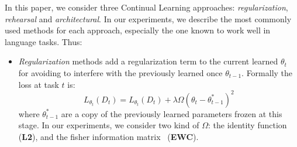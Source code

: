 \documentclass[11pt,a4paper]{article}
\begin{document}
In this paper, we consider three Continual Learning approaches: \textit{regularization},
\textit{rehearsal} and \textit{architectural}. In our experiments, we describe the most commonly used methods for each approach, especially the one known to work well in language tasks. Thus:
\begin{itemize}[noitemsep]
    \item \textit{Regularization} methods add a regularization term to the current learned $\theta_t$ for avoiding to interfere with the previously learned once $\theta_{t-1}$. Formally the loss at task $t$ is:
    \begin{equation}
        L_{\theta_t}(D_t) = L_{\theta_t}(D_t) + \lambda \Omega (\theta_t - \theta^*_{t-1})^2
    \end{equation}
    where $\theta^*_{t-1}$ are a copy of the previously learned parameters frozen at this stage. In our experiments, we consider two kind of $\Omega$: the identity function (\textbf{L2}), and the fisher information matrix~\cite{kirkpatrick2017overcoming} (\textbf{EWC}).  
    

\end{itemize}
\end{document}
